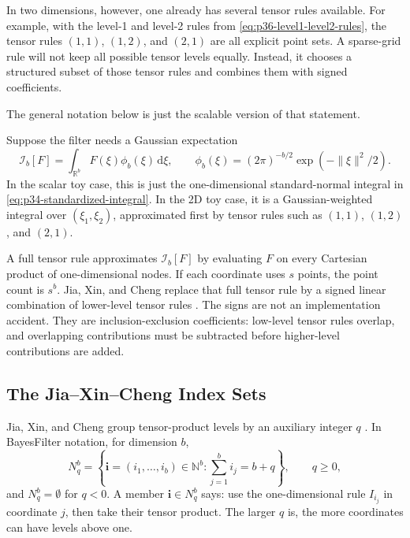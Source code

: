 \documentclass[11pt]{article}
\numberwithin{equation}{section}
\newcommand{\R}{\mathbb R}
\newcommand{\dd}{\,\mathrm d}
\begin{document}
In two dimensions, however, one already has several tensor rules available.  For
example, with the level-1 and level-2 rules from
\eqref{eq:p36-level1-level2-rules}, the tensor rules \((1,1)\), \((1,2)\), and
\((2,1)\) are all explicit point sets.  A sparse-grid rule will not keep all
possible tensor levels equally.  Instead, it chooses a structured subset of
those tensor rules and combines them with signed coefficients.

The general notation below is just the scalable version of that statement.

Suppose the filter needs a Gaussian expectation
\begin{equation}
  \mathcal I_b[F]
  =
  \int_{\R^b}F(\xi)\phi_b(\xi)\dd\xi,
  \qquad
  \phi_b(\xi)=(2\pi)^{-b/2}\exp(-\|\xi\|^2/2).
  \label{eq:p32-gaussian-integral-target}
\end{equation}
In the scalar toy case, this is just the one-dimensional standard-normal integral
in \eqref{eq:p34-standardized-integral}.  In the 2D toy case, it is a
Gaussian-weighted integral over \((\xi_1,\xi_2)\), approximated first by tensor
rules such as \((1,1)\), \((1,2)\), and \((2,1)\).

A full tensor rule approximates \(\mathcal I_b[F]\) by evaluating \(F\) on
every Cartesian product of one-dimensional nodes.  If each coordinate uses
\(s\) points, the point count is \(s^b\).  Jia, Xin, and Cheng replace that
full tensor rule by a signed linear combination of lower-level tensor rules
\cite[Section 3.1]{jia2012sparsegrid}.  The signs are not an implementation
accident.  They are inclusion-exclusion coefficients: low-level tensor rules
overlap, and overlapping contributions must be subtracted before higher-level
contributions are added.

\subsection{The Jia--Xin--Cheng Index Sets}
\label{subsec:p32-source-index-sets}

Jia, Xin, and Cheng group tensor-product levels by an auxiliary integer \(q\)
\cite[Eq. 27]{jia2012sparsegrid}.  In BayesFilter notation, for dimension
\(b\),
\begin{equation}
  N_q^b
  =
  \left\{\mathbf i=(i_1,\ldots,i_b)\in\mathbb N^b:
  \sum_{j=1}^b i_j=b+q\right\},
  \qquad q\ge 0,
  \label{eq:p32-Nqb}
\end{equation}
and \(N_q^b=\emptyset\) for \(q<0\).  A member
\(\mathbf i\in N_q^b\) says: use the one-dimensional rule \(I_{i_j}\) in
coordinate \(j\), then take their tensor product.  The larger \(q\) is, the
more coordinates can have levels above one.
\end{document}
